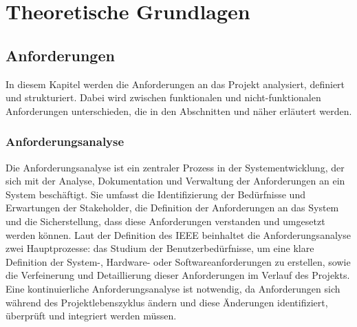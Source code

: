 


\chapter{Theoretische Grundlagen} \label{theoretische_grundlagen}

\section{Anforderungen} \label{Anforderungen}
In diesem Kapitel werden die Anforderungen an das Projekt analysiert, definiert und strukturiert. Dabei wird zwischen funktionalen und nicht-funktionalen Anforderungen unterschieden, die in den Abschnitten  und  näher erläutert werden.
\subsection{Anforderungsanalyse}
Die Anforderungsanalyse ist ein zentraler Prozess in der Systementwicklung, der sich mit der Analyse, Dokumentation und Verwaltung der Anforderungen an ein System beschäftigt. Sie umfasst die Identifizierung der Bedürfnisse und Erwartungen der Stakeholder, die Definition der Anforderungen an das System und die Sicherstellung, dass diese Anforderungen verstanden und umgesetzt werden können. Laut der Definition des \ac{IEEE} beinhaltet die Anforderungsanalyse zwei Hauptprozesse: das Studium der Benutzerbedürfnisse, um eine klare Definition der System-, Hardware- oder Softwareanforderungen zu erstellen, sowie die Verfeinerung und Detaillierung dieser Anforderungen im Verlauf des Projekts. Eine kontinuierliche Anforderungsanalyse ist notwendig, da Anforderungen sich während des Projektlebenszyklus ändern und diese Änderungen identifiziert, überprüft und integriert werden müssen. \cite[Vgl.][]{IEEE} \cite[Vgl.][S. 83-84]{Sommerville}

